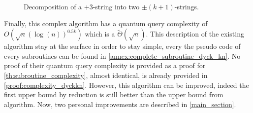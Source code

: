 \begin{itemize}
\begin{figure}[h!]
              \caption{Decomposition of a $+3$-string into two $\pm(k+1)$-strings.}
              \label{fig:dyck_hered}
          \end{figure}
\end{itemize}

Finally, this complex algorithm has a quantum query
complexity of $O\left(\sqrt{n}(\log(n))^{0.5k}\right)$ which is a
$\tilde{\Theta}\left(\sqrt{n}\right)$. This description of the existing
algorithm stay at the surface in order to stay simple, every the pseudo
code of every subroutines can be found in
\autoref{annex:complete_subroutine_dyck_kn}. No proof of their
quantum query complexity is provided as a proof for
\autoref{th:subroutine_complexity}, almost identical,
is already provided in \autoref{proof:complexity_dyckkn}.
However, this algorithm can
be improved, indeed the first upper bound by reduction
is still better than the upper bound from algorithm.
Now, two personal improvements are described in \autoref{main_section}.
